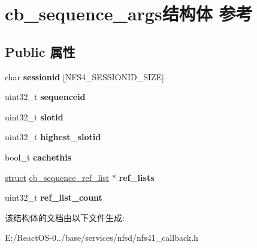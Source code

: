 \hypertarget{structcb__sequence__args}{}\section{cb\+\_\+sequence\+\_\+args结构体 参考}
\label{structcb__sequence__args}
\subsection*{Public 属性}
\begin{DoxyCompactItemize}
\item 
\mbox{\label{structcb__sequence__args_a009b643f5fa67c61eb2c1e670cda503b}} 
char {\bfseries sessionid} \mbox{[}N\+F\+S4\+\_\+\+S\+E\+S\+S\+I\+O\+N\+I\+D\+\_\+\+S\+I\+ZE\mbox{]}
\item 
\mbox{\label{structcb__sequence__args_acfa3fa96308d014d1e85b966717f1246}} 
uint32\+\_\+t {\bfseries sequenceid}
\item 
\mbox{\label{structcb__sequence__args_a804d19e25294f4425875739f66b87ed3}} 
uint32\+\_\+t {\bfseries slotid}
\item 
\mbox{\label{structcb__sequence__args_a34574a29315b94452c8adec975b8d746}} 
uint32\+\_\+t {\bfseries highest\+\_\+slotid}
\item 
\mbox{\label{structcb__sequence__args_a1ab903af49a347d3bcbc456f1b7fd9ab}} 
bool\+\_\+t {\bfseries cachethis}
\item 
\mbox{\label{structcb__sequence__args_a8bb92e697f4393e5c3272f09a466cd46}} 
\hyperlink{interfacestruct}{struct} \hyperlink{structcb__sequence__ref__list}{cb\+\_\+sequence\+\_\+ref\+\_\+list} $\ast$ {\bfseries ref\+\_\+lists}
\item 
\mbox{\label{structcb__sequence__args_a175fc89bc976aced4c9edd93c77402c2}} 
uint32\+\_\+t {\bfseries ref\+\_\+list\+\_\+count}
\end{DoxyCompactItemize}


该结构体的文档由以下文件生成\+:\begin{DoxyCompactItemize}
\item 
E\+:/\+React\+O\+S-\/0../base/services/nfsd/nfs41\+\_\+callback.\+h\end{DoxyCompactItemize}
